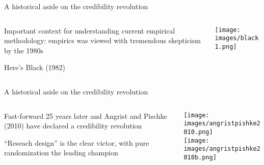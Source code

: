 \documentclass[notes,11pt, aspectratio=169]{beamer}
\newenvironment{wideitemize}{\itemize\addtolength{\itemsep}{10pt}}{\enditemize}
\begin{document}
\begin{frame}{A historical aside on the credibility revolution}
\begin{columns}[T] %
  \begin{column}{.4\textwidth}
    \begin{wideitemize}
    \item Important context for understanding current empirical
      methodology: empirics was viewed with tremendous skepticism by the 1980s
    \item Here's Black (1982)
    \end{wideitemize}
\end{column}%
\hfill%
\begin{column}{.6\textwidth}
    \texttt{[image: images/black1.png]}\\
\end{column}%
\end{columns}
\end{frame}

\begin{frame}{A historical aside on the credibility revolution}
\begin{columns}[T] %
  \begin{column}{.4\textwidth}
    \begin{wideitemize}
    \item Fast-forward 25 years later and Angrist and Pischke (2010) have declared a credibility revolution
    \item ``Reseach design'' is the clear victor, with pure randomization the leading champion
    \end{wideitemize}
\end{column}%
\hfill%
\begin{column}{.6\textwidth}
  \texttt{[image: images/angristpishke2010.png]}\\
  \texttt{[image: images/angristpishke2010b.png]}\\
\end{column}%
\end{columns}
\end{frame}
\end{document}
